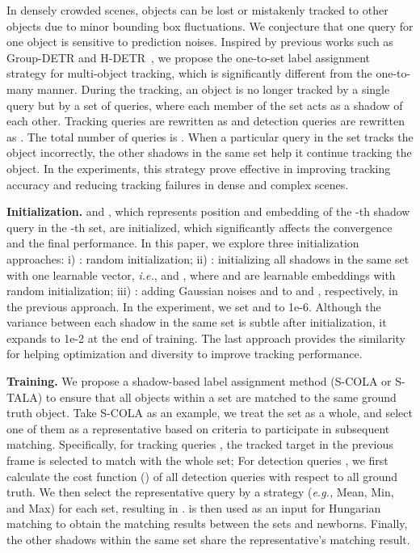\documentclass{article}
\begin{document}
In densely crowded scenes, objects can be lost or mistakenly tracked to other objects due to minor bounding box fluctuations. We conjecture that one query for one object is sensitive to prediction noises. Inspired by previous works such as Group-DETR\cite{chen2022group} and H-DETR~\cite{jia2022detrs}, we propose the one-to-set label assignment strategy for multi-object tracking, which is significantly different from the one-to-many manner. During the tracking, an object is no longer tracked by a single query but by a set of queries, where each member of the set acts as a shadow of each other. Tracking queries are rewritten as  and detection queries are rewritten as . The total number of queries is . When a particular query in the set tracks the object incorrectly, the other shadows in the same set help it continue tracking the object. In the experiments, this strategy prove effective in improving tracking accuracy and reducing tracking failures in dense and complex scenes.


\textbf{Initialization.}  and , which represents position and embedding of the -th shadow query in the -th set, are initialized, which significantly affects the convergence and the final performance. 
In this paper, we explore three initialization approaches: i) : random initialization; ii) : initializing all shadows in the same set with one learnable vector, \textit{i.e.},  and , where  and  are learnable embeddings with random initialization; iii) : adding Gaussian noises  and  to  and , respectively, in the previous approach. 
In the experiment, we set  and  to 1e-6. Although the variance between each shadow in the same set is subtle after initialization, it expands to 1e-2 at the end of training. The last approach provides the similarity for helping optimization and diversity to improve tracking performance. 

\textbf{Training.} We propose a shadow-based label assignment method (S-COLA or S-TALA) to ensure that all objects within a set are matched to the same ground truth object. Take S-COLA as an example, we treat the set as a whole, and select one of them as a representative based on criteria to participate in subsequent matching. Specifically, for tracking queries , the tracked target in the previous frame is selected to match with the whole set; For detection queries , we first calculate the cost function () of all detection queries with respect to all ground truth. We then select the representative query by a strategy  (\textit{e.g., } Mean, Min, and Max) for each set, resulting in .  is then used as an input for Hungarian matching to obtain the matching results between the sets and newborns. Finally, the other shadows within the same set share the representative's matching result.
\end{document}

